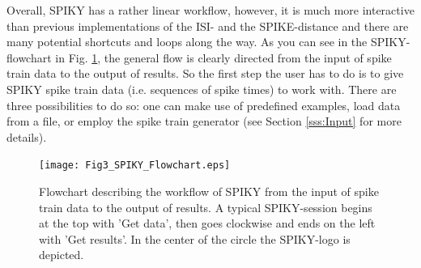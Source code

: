 \documentclass[10pt,twocolumn]{elsart5p}
\begin{document}
Overall, SPIKY has a rather linear workflow, however, it is much more interactive than previous implementations of the ISI- and the SPIKE-distance and there are many potential shortcuts and loops along the way. As you can see in the SPIKY-flowchart in Fig. \ref{fig:Fig3-SPIKY-Flowchart}, the general flow is clearly directed from the input of spike train data to the output of results. So the first step the user has to do is to give SPIKY spike train data (i.e. sequences of spike times) to work with. There are three possibilities to do so: one can make use of predefined examples, load data from a file, or employ the spike train generator (see Section \ref{sss:Input} for more details).
%
%
\begin{figure}
    \texttt{[image: Fig3\_SPIKY\_Flowchart.eps]}
    \caption{\abb\label{fig:Fig3-SPIKY-Flowchart} Flowchart describing the workflow of SPIKY from 	the input of spike train data to the output of results. A typical SPIKY-session begins at the top with 'Get data', then goes clockwise and ends on the left with 'Get results'. In the center of the circle the SPIKY-logo is depicted.}
\end{figure}
%
\end{document}
